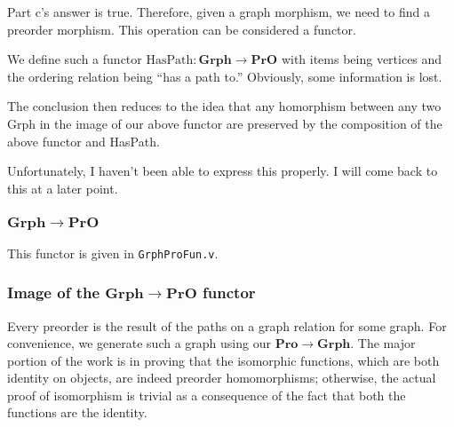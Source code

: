 \documentclass[12pt,twocolumn,oneside]{book}
\begin{document}
Part c's answer is true. Therefore, given a graph morphism, we need to find a preorder
morphism. This operation can be considered a functor.

We define such a functor $\mathrm{HasPath} : \mathbf{Grph} \to \mathbf{PrO}$ with items being vertices
and the ordering relation being ``has a path to.'' Obviously, some information is lost.

The conclusion then reduces to the idea that any homorphism between any two Grph
in the image of our above functor are preserved by the composition of the above
functor and HasPath.

Unfortunately, I haven't been able to express this properly. I will come back
to this at a later point. %


\subsubsection{$\mathbf{Grph} \to \mathbf{PrO}$}

This functor is given in \texttt{GrphProFun.v}.


\subsubsection{Image of the $\mathbf{Grph} \to \mathbf{PrO}$ functor}

Every preorder is the result of the paths on a graph relation for some graph. For convenience,
we generate such a graph using our $\mathbf{Pro} \to \mathbf{Grph}$. The major
portion of the work is in proving that the isomorphic functions, which are both
identity on objects, are indeed preorder homomorphisms; otherwise, the actual proof
of isomorphism is trivial as a consequence of the fact that both the functions are
the identity.
\end{document}
